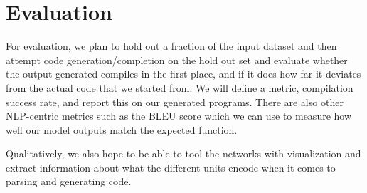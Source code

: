 \documentclass{article}
\begin{document}
\section{Evaluation}
For evaluation, we plan to hold out a fraction of the input dataset and then attempt code generation/completion on the hold out set and evaluate whether the output generated compiles in the first place, and if it does how far it deviates from the actual code that we started from. We will define a metric, compilation success rate, and report this on our generated programs. There are also other NLP-centric metrics such as the BLEU score \cite{retrieval_based_neural_code_generation} which we can use to measure how well our model outputs match the expected function.

Qualitatively, we also hope to be able to tool the networks with visualization \cite{visualizing_rnns} and extract information about what the different units encode when it comes to parsing and generating code.



\end{document}

